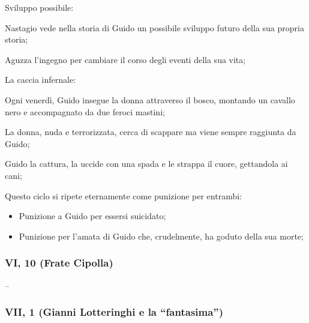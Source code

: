 \documentclass{article}
\begin{document}
\begin{enumerate}
\begin{subenumerate}
\begin{itemize}
                \end{itemize}
            \item Sviluppo possibile:
                \begin{subenumerate}
                    \item Nastagio vede nella storia di Guido un possibile sviluppo futuro
                        della sua propria storia;
                    \item Aguzza l'ingegno per cambiare il corso degli eventi della sua vita;
                \end{subenumerate}
        \end{subenumerate}
    \item La caccia infernale:
        \begin{subenumerate}
            \item Ogni venerdì, Guido insegue la donna attraverso il bosco, montando un
                cavallo nero e accompagnato da due feroci mastini;
            \item La donna, nuda e terrorizzata, cerca di scappare ma viene sempre raggiunta
                da Guido;
            \item Guido la cattura, la uccide con una spada e le strappa il cuore, gettandola
                ai cani;
            \item Questo ciclo si ripete eternamente come punizione per entrambi:
                \begin{itemize}
                    \item Punizione a Guido per essersi suicidato;
                    \item Punizione per l'amata di Guido che, crudelmente, ha goduto della
                        sua morte;
                \end{itemize}
        \end{subenumerate}
\end{enumerate}

\newpage
\subsubsection{VI, 10 (Frate Cipolla)}

--

\newpage
\subsubsection{VII, 1 (Gianni Lotteringhi e la ``fantasima'')}
\end{document}
